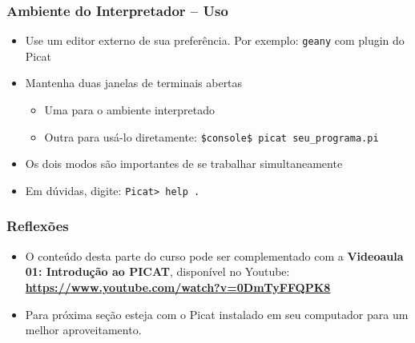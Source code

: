 \begin{frame}[fragile]
\frametitle{Ambiente do Interpretador -- Uso}

\begin{itemize}
  \item Use um editor externo de sua preferência. Por exemplo:
   \texttt{geany} com plugin do Picat

    \pause
  \item Mantenha duas janelas de terminais abertas
    \begin{itemize}
    \item Uma para o ambiente interpretado
    \item Outra para usá-lo diretamente: \texttt{\$console\$ picat seu\_programa.pi}
  \end{itemize}
  
    \pause
  \item Os dois modos são importantes de se trabalhar simultaneamente
  
  \pause
  \item Em dúvidas, digite: \texttt{Picat> help .}
    
\end{itemize}

\end{frame}












\begin{frame}[fragile]
\frametitle{Reflexões}

\begin{itemize}


  \item O conteúdo desta parte do curso pode ser complementado
  com a   \textbf{Videoaula 01: Introdução ao PICAT}, disponível no Youtube:\\
    \textbf{\url {https://www.youtube.com/watch?v=0DmTyFFQPK8}}

      \pause
      \item Para próxima seção esteja com o Picat instalado em seu 
      computador para um melhor aproveitamento.
\end{itemize}

\end{frame}

